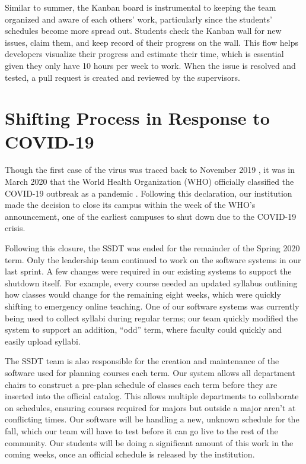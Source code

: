Similar to summer, the Kanban board is instrumental to keeping the team organized and aware of each others' work, particularly since the students' schedules become more spread out. Students check the Kanban wall for new issues, claim them, and keep record of their progress on the wall. This flow helps developers visualize their progress and estimate their time, which is essential given they only have 10 hours per week to work. When the issue is resolved and tested, a pull request is created and reviewed by the supervisors.


\section{Shifting Process in Response to COVID-19}
Though the first case of the virus was traced back to November 2019 \cite{}, it was in March 2020 that the World Health Organization (WHO) officially classified the COVID-19 outbreak as a pandemic \cite{}. Following this declaration, our institution made the decision to close its campus within the week of the WHO's announcement, one of the earliest campuses to shut down due to the COVID-19 crisis.

Following this closure, the SSDT was ended for the remainder of the Spring 2020 term. Only the leadership team continued to work on the software systems in our last sprint. A few changes were required in our existing systems to support the shutdown itself. For example, every course needed an updated syllabus outlining how classes would change for the remaining eight weeks, which were quickly shifting to emergency online teaching. One of our software systems was currently being used to collect syllabi during regular terms; our team quickly modified the system to support an addition, ``odd'' term, where faculty could quickly and easily upload syllabi.

The SSDT team is also responsible for the creation and maintenance of the software used for planning courses each term. Our system allows all department chairs to construct a pre-plan schedule of classes each term before they are inserted into the official catalog. This allows multiple departments to collaborate on schedules, ensuring courses required for majors but outside a major aren't at conflicting times. Our software will be handling a new, unknown schedule for the fall, which our team will have to test before it can go live to the rest of the community. Our students will be doing a significant amount of this work in the coming weeks, once an official schedule is released by the institution.

